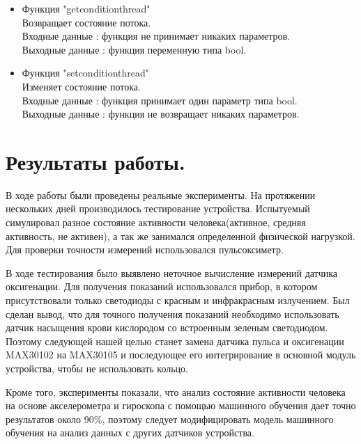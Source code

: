 \documentclass[a4document]{article}
\begin{document}
{\begin{itemize}
\begin{itemize}
                Закрывает Serial Port и останавливает передачу данных. \\
                Входные данные : функция принмает объект класса str. \\ 
                Выходные данные : функция не возвращает никаких параметров.
            \item Функция "getconditionthread" \\
                Возвращает состояние потока. \\
                Входные данные : функция не принимает никаких параметров. \\ 
                Выходные данные : функция переменную типа bool.
            \item Функция "setconditionthread" \\
                Изменяет состояние потока. \\
                Входные данные : функция принимает один параметр типа bool. \\ 
                Выходные данные : функция не возвращает никаких параметров.
        \end{itemize}
        
\end{itemize}
}

{
\newpage
\section*{Результаты работы.} 
В ходе работы были проведены реальные эксперименты. На протяжении \\
нескольких дней производилось тестирование устройства.
Испытуемый симулировал разное состояние активности человека(активное, средняя активность, не активен), 
а так же занимался определенной физической нагрузкой. 
Для проверки точности измерений использовался пульсоксиметр. 
\par \noindent
В ходе тестирования было выявлено неточное вычисление измерений датчика оксигенации.
Для получения показаний использовался прибор, в котором присутствовали только светодиоды
с красным и инфракрасным излучением. Был сделан вывод, что для точного получения показаний необходимо 
использовать датчик насыщения крови кислородом со встроенным зеленым светодиодом.
Поэтому следующей нашей целью станет замена датчика пульса и оксигенации MAX30102 на MAX30105 и
последующее его интегрирование в основной модуль устройства, чтобы не использовать кольцо.
\par \noindent
Кроме того, эксперименты показали, что анализ состояние активности человека на основе 
акселерометра и гироскопа с помощью машинного обучения дает точно результатов около 90\%, 
поэтому следует модифицировать модель машинного обучения на анализ данных с других датчиков устройства.



}
\end{document}
